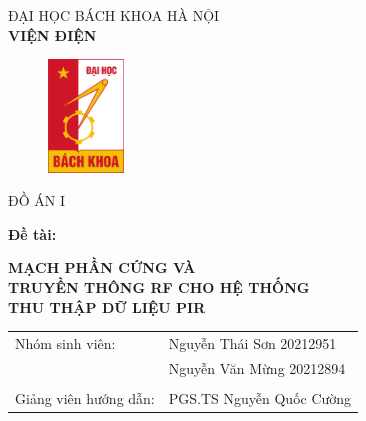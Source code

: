 \documentclass{article}
\begin{document}
\begin{titlepage}

\begin{center}
    \vspace{-10pt} ĐẠI HỌC BÁCH KHOA HÀ NỘI\\
    \textbf{\fontsize{16pt}{0pt}\selectfont VIỆN ĐIỆN}
    \vspace{0.5cm}
    \begin{figure}[H]
        \centering
        \includegraphics[width=2cm,height=3cm]{image/logo.png}
    \end{figure}


    \vspace{1cm}
    \fontsize{24pt}{0pt}\selectfont ĐỒ ÁN I\\
\end{center}
\hspace{15pt} \textbf{\fontsize{14pt}{0pt}\selectfont Đề tài:\\}
\begin{center}
    \textbf{\fontsize{20pt}{0pt}\selectfont MẠCH PHẦN CỨNG VÀ\\}
    \textbf{\fontsize{20pt}{0pt}\selectfont TRUYỀN THÔNG RF CHO HỆ THỐNG \\}
    \textbf{\fontsize{20pt}{0pt}\selectfont THU THẬP DỮ LIỆU PIR \\}
\end{center}
\vspace{1cm}
\begin{tabular}{l l}
    \hspace{15pt}
    \fontsize{14pt}{0pt}\selectfont Nhóm sinh viên: & \fontsize{16pt}{0pt}\selectfont Nguyễn Thái Sơn 20212951\\
    &\fontsize{16pt}{0pt}\selectfont Nguyễn Văn Mừng 20212894\\
    \hspace{15pt}\\
    \hspace{15pt}
    \fontsize{14pt}{0pt}\selectfont Giảng viên hướng dẫn: & \fontsize{16pt}{0pt}\selectfont PGS.TS Nguyễn Quốc Cường  \\
   


\end{tabular}
\end{titlepage}
\end{document}
